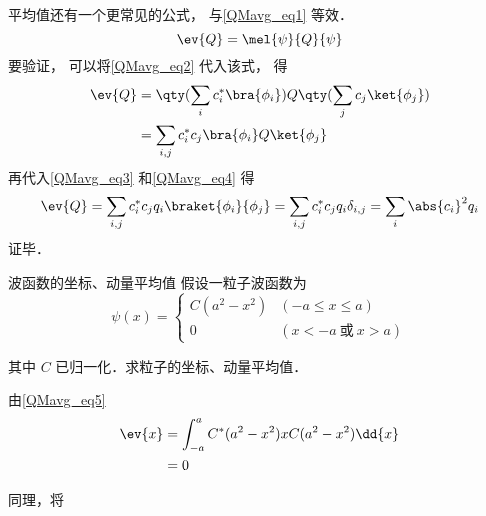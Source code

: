 平均值还有一个更常见的公式， 与\autoref{QMavg_eq1} 等效．
\begin{equation}\label{QMavg_eq5}
\ev{Q} = \mel{\psi}{Q}{\psi}
\end{equation}
要验证， 可以将\autoref{QMavg_eq2} 代入该式， 得
\begin{equation}
\begin{aligned}
\ev{Q} &= \qty(\sum_i c_i^* \bra{\phi_i}) Q \qty(\sum_j c_j \ket{\phi_j})\\
&= \sum_{i,j} c_i^* c_j \bra{\phi_i} Q \ket{\phi_j}
\end{aligned} 
\end{equation}
再代入\autoref{QMavg_eq3} 和\autoref{QMavg_eq4} 得
\begin{equation}
\ev{Q} = \sum_{i,j} c_i^* c_j q_i \braket{\phi_i}{\phi_j}
= \sum_{i,j} c_i^* c_j q_i \delta_{i,j} = \sum_i \abs{c_i}^2 q_i
\end{equation}
证毕．

\begin{example}{波函数的坐标、动量平均值}
假设一粒子波函数为
\begin{equation}
\psi(x)=
\begin{cases}
C(a^2-x^2) &(-a\leqslant x\leqslant a)\\
0 &(x<-a \ \text{或}\ x>a) 
\end{cases}
\end{equation}

其中 $C$ 已归一化．求粒子的坐标、动量平均值．

由\autoref{QMavg_eq5} 
\begin{equation}
\begin{aligned}
\ev{x}&= \int_{-a}^a C^*(a^2-x^2)xC(a^2-x^2)\dd{x}\\
&= 0
\end{aligned}
\end{equation}

同理，将
\end{example}






